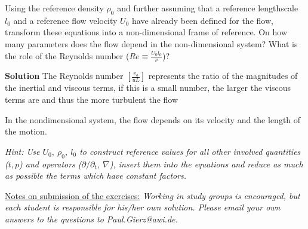 \documentclass[a4paper,12pt]{article}
\begin{document}
\begin{enumerate}
Using the reference density $\rho_0$ and further assuming that a reference lengthscale $l_0$ and a reference flow velocity $U_0$ have already been defined for the flow, transform these equations into a non-dimensional frame of reference. On how many parameters does the flow depend in the non-dimensional system? What is the role of the Reynolds number ($Re\equiv \frac{U_0 l_0}{\nu}$)?


\textbf{Solution} The Reynolds number $\left[ \frac{v_{o}}{uL} \right]$ represents the ratio of the
magnitudes of the inertial and viscous terms, if this is a small
number, the larger the viscous terms are and thus the more turbulent
the flow 

In the nondimensional system, the flow depends on its velocity and the
length of the motion.

{\small
      \textit{Hint: Use $U_0,\ \rho_0,\ l_0$ to construct reference values
      for all other involved quantities ($t,p$) and operators
      ($\partial/\partial_t,\ \nabla$), insert them into the equations
      and reduce as much as possible the terms which have constant
      factors.}}

\end{enumerate}


\vfill
\underline{Notes on submission of the exercises:}
 \textit{
Working in study groups  is encouraged, but each student is responsible for his/her own solution.
Please email your own answers to the questions to Paul.Gierz@awi.de.
}
\end{document}
